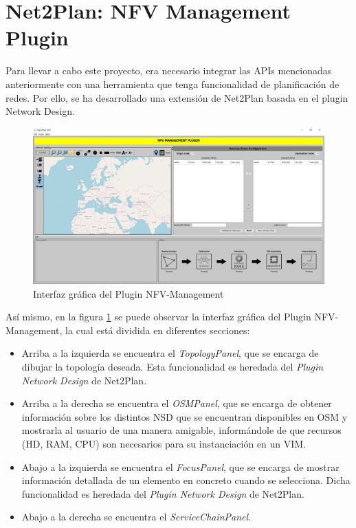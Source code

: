 \section{Net2Plan: NFV Management Plugin}
\label{sec:nfvplugin}

Para llevar a cabo este proyecto, era necesario integrar las APIs mencionadas anteriormente con una herramienta que tenga funcionalidad de planificación de redes. Por ello, se ha desarrollado una extensión de Net2Plan basada en el plugin Network Design.


\begin{figure}[!ht]
	\centering
	\includegraphics[width=0.9\linewidth]{imagenes/nfvplugin_dashboard}
	\caption{Interfaz gráfica del Plugin NFV-Management}
	\label{fig:nfvplugindash}
\end{figure}

Así mismo, en la figura \ref{fig:nfvplugindash} se puede observar la interfaz gráfica del Plugin NFV-Management, la cual está dividida en diferentes secciones:

\begin{itemize}
	\item Arriba a la izquierda se encuentra el \textit{TopologyPanel}, que se encarga de dibujar la topología deseada. Esta funcionalidad es heredada del \textit{Plugin Network Design} de Net2Plan.
	
	\item Arriba a la derecha se encuentra el \textit{OSMPanel}, que se encarga de obtener información sobre los distintos NSD que se encuentran disponibles en OSM y mostrarla al usuario de una manera amigable, informándole de que recursos (HD, RAM, CPU) son necesarios para su instanciación en un VIM.
	
	\item Abajo a la izquierda se encuentra el \textit{FocusPanel}, que se encarga de mostrar información detallada de un elemento en concreto cuando se selecciona. Dicha funcionalidad es heredada del \textit{Plugin Network Design} de Net2Plan.
	
	\item Abajo a la derecha se encuentra el \textit{ServiceChainPanel}.
\end{itemize}




\cleardoublepage